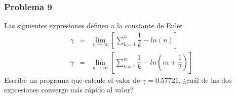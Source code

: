 \begin{frame}
\frametitle{Problema 9}
Las siguientes expresiones definen a la constante de Euler
\begin{eqnarray}
\gamma &=& \lim_{n \rightarrow \infty} \left[ \sum_{k=1}^{n} \dfrac{1}{k} - ln (n) \right] \\
\gamma &=& \lim_{k \rightarrow \infty} \left[ \sum_{k=1}^{m} \dfrac{1}{k} - ln \left( m + \dfrac{1}{2} \right) \right]
\end{eqnarray}
Escribe un programa que calcule el valor de $\gamma = 0.57721$, ¿cuál de las dos expresiones converge más rápido al valor?
\end{frame}
